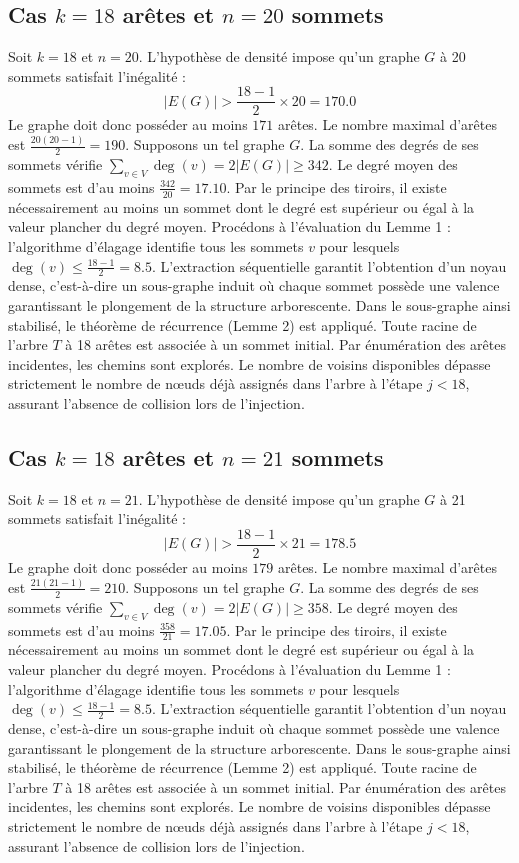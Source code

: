 \documentclass[12pt,a4paper]{article}
\begin{document}
\subsection{Cas $k = 18$ arêtes et $n = 20$ sommets}
Soit $k = 18$ et $n = 20$. L'hypothèse de densité impose qu'un graphe $G$ à 20 sommets satisfait l'inégalité :
$$ |E(G)| > \frac{18-1}{2} \times 20 = 170.0 $$
Le graphe doit donc posséder au moins $171$ arêtes. Le nombre maximal d'arêtes est $\frac{20(20-1)}{2} = 190$.
Supposons un tel graphe $G$. La somme des degrés de ses sommets vérifie $\sum_{v \in V} \deg(v) = 2|E(G)| \geq 342$.
Le degré moyen des sommets est d'au moins $\frac{342}{20} = 17.10$.
Par le principe des tiroirs, il existe nécessairement au moins un sommet dont le degré est supérieur ou égal à la valeur plancher du degré moyen.
Procédons à l'évaluation du Lemme 1 : l'algorithme d'élagage identifie tous les sommets $v$ pour lesquels $\deg(v) \leq \frac{18-1}{2} = 8.5$.
L'extraction séquentielle garantit l'obtention d'un noyau dense, c'est-à-dire un sous-graphe induit où chaque sommet possède une valence garantissant le plongement de la structure arborescente.
Dans le sous-graphe ainsi stabilisé, le théorème de récurrence (Lemme 2) est appliqué. Toute racine de l'arbre $T$ à 18 arêtes est associée à un sommet initial. Par énumération des arêtes incidentes, les chemins sont explorés. Le nombre de voisins disponibles dépasse strictement le nombre de nœuds déjà assignés dans l'arbre à l'étape $j < 18$, assurant l'absence de collision lors de l'injection.

\subsection{Cas $k = 18$ arêtes et $n = 21$ sommets}
Soit $k = 18$ et $n = 21$. L'hypothèse de densité impose qu'un graphe $G$ à 21 sommets satisfait l'inégalité :
$$ |E(G)| > \frac{18-1}{2} \times 21 = 178.5 $$
Le graphe doit donc posséder au moins $179$ arêtes. Le nombre maximal d'arêtes est $\frac{21(21-1)}{2} = 210$.
Supposons un tel graphe $G$. La somme des degrés de ses sommets vérifie $\sum_{v \in V} \deg(v) = 2|E(G)| \geq 358$.
Le degré moyen des sommets est d'au moins $\frac{358}{21} = 17.05$.
Par le principe des tiroirs, il existe nécessairement au moins un sommet dont le degré est supérieur ou égal à la valeur plancher du degré moyen.
Procédons à l'évaluation du Lemme 1 : l'algorithme d'élagage identifie tous les sommets $v$ pour lesquels $\deg(v) \leq \frac{18-1}{2} = 8.5$.
L'extraction séquentielle garantit l'obtention d'un noyau dense, c'est-à-dire un sous-graphe induit où chaque sommet possède une valence garantissant le plongement de la structure arborescente.
Dans le sous-graphe ainsi stabilisé, le théorème de récurrence (Lemme 2) est appliqué. Toute racine de l'arbre $T$ à 18 arêtes est associée à un sommet initial. Par énumération des arêtes incidentes, les chemins sont explorés. Le nombre de voisins disponibles dépasse strictement le nombre de nœuds déjà assignés dans l'arbre à l'étape $j < 18$, assurant l'absence de collision lors de l'injection.
\end{document}
